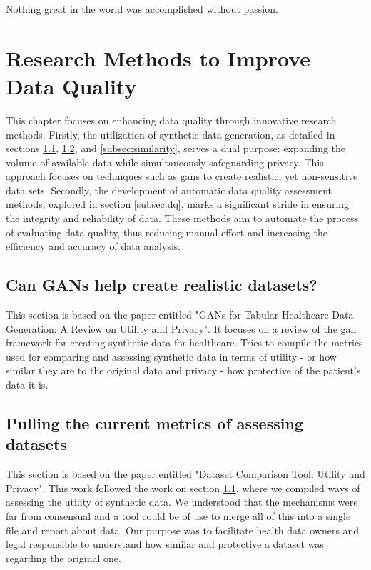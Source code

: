 \begin{savequote}[85mm]
    Nothing great in the world was accomplished 
    without passion.
    \end{savequote}


\chapter{Research Methods to Improve Data Quality}\label{chap:goal1}
This chapter focuses on enhancing data quality through innovative research methods. Firstly, the utilization of synthetic data generation, as detailed in sections \ref{subsec:gans}, \ref{subsec:tabular}, and \ref{subsec:similarity}, serves a dual purpose: expanding the volume of available data while simultaneously safeguarding privacy. This approach focuses on  techniques such as \acp{gan} to create realistic, yet non-sensitive data sets. Secondly, the development of automatic data quality assessment methods, explored in section \ref{subsec:dq}, marks a significant stride in ensuring the integrity and reliability of data. These methods aim to automate the process of evaluating data quality, thus reducing manual effort and increasing the efficiency and accuracy of data analysis.



\section{Can GANs help create realistic datasets?}\label{subsec:gans}
This section is based on the paper entitled "GANs for Tabular Healthcare Data Generation: A Review on Utility and Privacy". It focuses on a review of the \ac{gan} framework for creating synthetic data for healthcare. Tries to compile the metrics used for comparing and assessing synthetic data in terms of utility - or how similar they are to the original data and privacy - how protective of the patient's data it is. 



\section{Pulling the current metrics of assessing datasets}\label{subsec:tabular}
This section is based on the paper entitled "Dataset Comparison Tool: Utility and Privacy". This work followed the work on section \ref{subsec:gans}, where we compiled ways of assessing the utility of synthetic data. We understood that the mechanisms were far from consensual and a tool could be of use to merge all of this into a single file and report about data. Our purpose was to facilitate health data owners and legal responsible to understand how similar and protective a dataset was regarding the original one.

